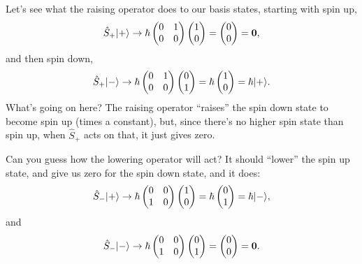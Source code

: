 Let's see what the raising operator does to our basis states, starting with spin up,
\[
\hat{S}_+ | + \rangle \to \hbar \begin{pmatrix} 0 & 1 \\ 0 & 0 \end{pmatrix} \begin{pmatrix} 1 \\ 0 \end{pmatrix} = \begin{pmatrix} 0 \\ 0 \end{pmatrix} = \mathbf{0},
\]
and then spin down,
\[
\hat{S}_+ | - \rangle \to \hbar \begin{pmatrix} 0 & 1 \\ 0 & 0 \end{pmatrix} \begin{pmatrix} 0 \\ 1 \end{pmatrix} = \hbar \begin{pmatrix} 1 \\ 0 \end{pmatrix} = \hbar | + \rangle.
\]
What's going on here?  The raising operator ``raises'' the spin down state to become spin up (times a constant), but, since there's no higher spin state than spin up, when $\hat{S}_+$ acts on that, it just gives zero.

Can you guess how the lowering operator will act?  It should ``lower'' the spin up state, and give us zero for the spin down state, and it does:
\[
\hat{S}_- | + \rangle \to \hbar \begin{pmatrix} 0 & 0 \\ 1 & 0 \end{pmatrix} \begin{pmatrix} 1 \\ 0 \end{pmatrix} = \hbar \begin{pmatrix} 0 \\ 1 \end{pmatrix} = \hbar | - \rangle,
\]
and
\[
\hat{S}_- | - \rangle \to \hbar \begin{pmatrix} 0 & 0 \\ 1 & 0 \end{pmatrix} \begin{pmatrix} 0 \\ 1 \end{pmatrix} = \begin{pmatrix} 0 \\ 0 \end{pmatrix} = \mathbf{0}.
\]

